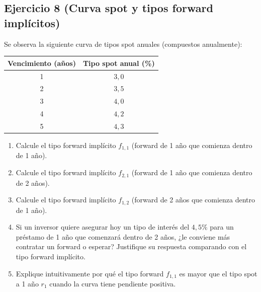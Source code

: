 \documentclass[12pt,a4paper]{article}
\newenvironment{ejercicio}[1]{\subsection*{Ejercicio #1}}{}
\begin{document}
 \begin{ejercicio}{8 (Curva spot y tipos forward implícitos)}
 Se observa la siguiente curva de tipos spot anuales (compuestos anualmente):
 \begin{center}
 \begin{tabular}{cc}
 \toprule
 Vencimiento (años) & Tipo spot anual (\%) \\
 \midrule
 1 & \(3{,}0\) \\
 2 & \(3{,}5\) \\
 3 & \(4{,}0\) \\
 4 & \(4{,}2\) \\
 5 & \(4{,}3\) \\
 \bottomrule
 \end{tabular}
 \end{center}
 \begin{enumerate}[label=\alph*)]
   \item Calcule el tipo forward implícito \(f_{1,1}\) (forward de 1 año que comienza dentro de 1 año).
   \item Calcule el tipo forward implícito \(f_{2,1}\) (forward de 1 año que comienza dentro de 2 años).
   \item Calcule el tipo forward implícito \(f_{1,2}\) (forward de 2 años que comienza dentro de 1 año).
   \item Si un inversor quiere asegurar hoy un tipo de interés del \(4{,}5\%\) para un préstamo de 1 año que comenzará dentro de 2 años, ¿le conviene más contratar un forward o esperar? Justifique su respuesta comparando con el tipo forward implícito.
   \item Explique intuitivamente por qué el tipo forward \(f_{1,1}\) es mayor que el tipo spot a 1 año \(r_1\) cuando la curva tiene pendiente positiva.
 \end{enumerate}
 \end{ejercicio}
\end{document}
